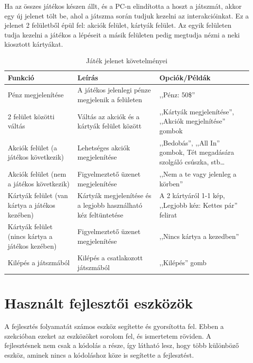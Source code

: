 \documentclass[]{thesis-ekf}
\theoremstyle{definition}
\theoremstyle{remark}
\begin{document}
Ha az összes játékos készen állt, és a PC-n elindította a hoszt a játszmát, akkor egy új jelenet tölt be, ahol a játszma során tudjuk kezelni az interakcióinkat. Ez a jelenet 2 felületből épül fel: akciók felület, kártyák felület. Az egyik felületen tudja kezelni a játékos a lépéseit a másik felületen pedig megtudja nézni a neki kiosztott kártyákat.

\begin{table}[ht!]
	\centering
	\footnotesize
	\begin{tabular}{|p{4cm}|p{7cm}|p{4cm}|}
		\hline
		\textbf{Funkció} & \textbf{Leírás} & \textbf{Opciók/Példák} \\ 
		\hline
		Pénz megjelenítése & A játékos jelenlegi pénze megjelenik a felületen & ,,Pénz: 50\$'' \\ 
		\hline
		2 felület közötti váltás & Váltás az akciók és a kártyák felület között & ,,Kártyák megjelenítése'', ,,Akciók megjelnítése'' gombok \\ 
		\hline
		Akciók felület (a játékos következik) & Lehetséges akciók megjelenítése & ,,Bedobás'', ,,All In'' gombok, Tét megadására szolgáló csúszka, stb\dots \\ 
		\hline
		Akciók felület (nem a játékos következik) & Figyelmeztető üzenet megjelenítése & ,,Nem a te vagy jelenleg a körben'' \\ 
		\hline
		Kártyák felület (van kártya a játékos kezében) & Kártyák megjelenítése és a legjobb használható kéz feltüntetése & A 2 kártyáról 1-1 kép, ,,Legjobb kéz: Kettes pár'' felirat \\ 
		\hline
		Kártyák felület (nincs kártya a játékos kezében) & Figyelmeztető üzenet megjelenítése & ,,Nincs kártya a kezedben'' \\ 
		\hline
		Kilépés a játszmából & Kilépés a csatlakozott játszmából & ,,Kilépés'' gomb \\ 
		\hline
	\end{tabular}
	\caption{Játék jelenet követelményei}
\end{table}

\section{Használt fejlesztői eszközök}

A fejlesztés folyamatát számos eszköz segítette és gyorsította fel. Ebben a szekcióban ezeket az eszközöket sorolom fel, és ismertetem röviden. A fejlesztésnek nem csak a kódolás a része, így látható lesz, hogy több különböző eszköz, aminek nincs a kódoláshoz köze is segítette a fejlesztést.
\end{document}
